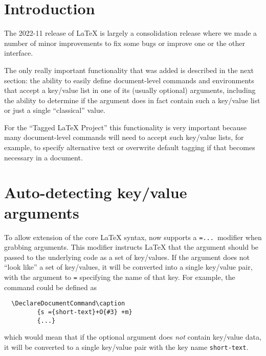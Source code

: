 \documentclass{ltnews}
\providecommand\tubcommand[1]{}
\begin{document}
\tubcommand{\addtolength\textheight{4.2pc}}   %

\maketitle
{  \spaceskip=3.33pt 
\tableofcontents}

\setlength{}


\medskip


\section{Introduction}

The 2022-11 release of \LaTeX{} is largely a consolidation release
where we made a number of minor improvements to fix some bugs or
improve one or the other interface.

The only really important functionality that was added is described in
the next section: the ability to easily define document-level commands
and environments that accept a key/value list in one of its (usually
optional) arguments, including the ability to determine if the argument
does in fact contain such a key/value list or just a single
\enquote{classical} value.

For the \enquote{Tagged \LaTeX{} Project} this functionality is very
important because many document-level commands will need to accept
such key/value lists, for example, to specify alternative text or
overwrite default tagging if that becomes necessary in a document.


\section{Auto-detecting key/value arguments}

To allow extension of the core \LaTeX{} syntax,  now supports
a \texttt{={...}}\ modifier when grabbing arguments. This modifier instructs
\LaTeX{} that the argument should be passed to the underlying code as
a set of key/values. If the argument does not \enquote{look like} a set
of key/values, it will be converted into a single key/value pair, with
the argument to \texttt{=} specifying the name of that key. For
example, the  command could be defined as
\begin{verbatim}
  \DeclareDocumentCommand\caption
         {s ={short-text}+O{#3} +m}
         {...}
\end{verbatim}
which would mean that if the optional argument does \emph{not}
contain key/value data, it will be converted to a single key/value
pair with the key name \texttt{short-text}.
\end{document}
